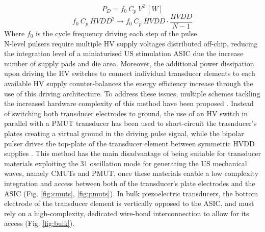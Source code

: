 \begin{equation}
    \label{eq:power_dissipation_cap}
    P_D = f_{0}  \ C_p \ V^2 \ [W]
\end{equation}
\begin{equation}
    \label{eq:dynamic_power_dissipation_reduction}
    f_0 \ C_p \ HVDD^2 \longrightarrow f_0 \ C_p \ HVDD \cdot \frac{HVDD}{N-1}
\end{equation}
Where $f_0$ is the cycle frequency driving each step of the pulse.
\\
N-level pulsers require multiple HV supply voltages distributed off-chip, reducing the integration level of a miniaturised US stimulation ASIC due the increase number of supply pads and die area. Moreover, the additional power dissipation upon driving the HV switches to connect individual transducer elements to each available HV supply counter-balances the energy efficiency increase through the use of this driving architecture. To address these issues, multiple schemes tackling the increased hardware complexity of this method have been proposed \cite{ref1,ref2,ref3,...}.  Instead of switching both transducer electrodes to ground, the use of an HV switch in parallel with a PMUT transducer has been used to short-circuit the trasnducer's plates creating a virtual ground in the driving pulse signal, while the bipolar pulser drives the top-plate of the transducer element between symmetric HVDD supplies \cite{}. This method has the main disadvantage of being suitable for transducer materials exploiting the 31 oscillation mode for generating the US mechanical waves, namely CMUTs and PMUT, once these materials enable a low complexity integration and access between both of the transducer's plate electrodes and the ASIC (Fig. \ref{fig:cmuts}, \ref{fig:pmuts}). In bulk piezoelectric transducers, the bottom electrode of the transducer element is vertically opposed to the ASIC, and must rely on a high-complexity, dedicated wire-bond interconnection to allow for its access (Fig. \ref{fig:bulk}).  
